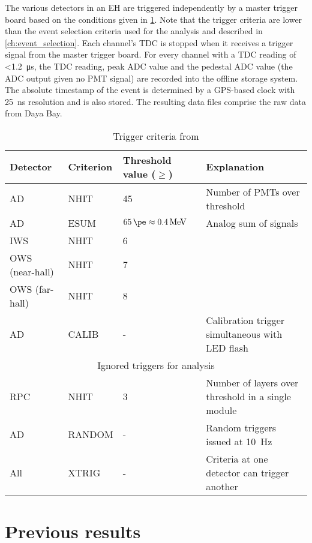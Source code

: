 The various detectors in an EH are triggered independently
by a master trigger board based on the conditions given in \cref{tab:trigger}.
Note that the trigger criteria are lower than the event selection
criteria used for the \thetaot{} analysis and described in \cref{ch:event_selection}.
Each channel's TDC is stopped when it receives a trigger signal
from the master trigger board.
For every channel with a TDC reading of \SI{<1.2}{\us},
the TDC reading, peak ADC value and the pedestal ADC value
(the ADC output given no PMT signal)
are recorded into the offline storage system.
The absolute timestamp of the event is determined by a GPS-based clock
with \SI{25}{\ns} resolution and is also stored.
The resulting data files comprise the raw data from Daya Bay.


\begin{table}[ht]
    \centering
    \begin{tabular}[t]{lllp{6cm}}
        \hline
        Detector & Criterion & Threshold value ($\geq$) & Explanation\\
        \hline
        AD & NHIT & \num{45} & Number of PMTs over threshold \\
        AD & ESUM & $\SI{65}{\pe}\approx \SI{0.4}{\MeV}$ & Analog sum of signals \\
        IWS & NHIT & \num{6} & \\
        OWS (near-hall) & NHIT & \num{7} & \\
        OWS (far-hall) & NHIT & \num{8} & \\
        AD & CALIB & - & Calibration trigger simultaneous with LED flash \\
        \hline
        \multicolumn{4}{c}{Ignored triggers for \thetaot{} analysis} \\
                       \hline
        RPC & NHIT & \num{3} & Number of layers over threshold in a single module \\
        AD & RANDOM & - & Random triggers issued at \SI{10}{\Hz} \\
        All & XTRIG & - & Criteria at one detector can trigger another \\
        \hline
    \end{tabular}
    \caption{Trigger criteria from \cite{ngd2016}}
    \label{tab:trigger}
\end{table}


\section{Previous results}

